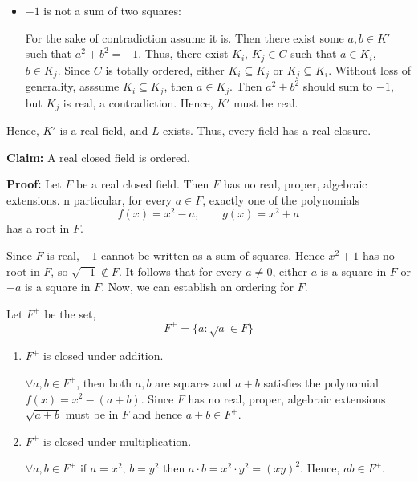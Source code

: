 \documentclass[12pt]{article}
\begin{document}
\begin{solution}
\begin{enumerate}
\begin{enumerate}
\begin{enumerate}
\begin{itemize}
                    \item $-1$ is not a sum of two squares: 

                    For the sake of contradiction assume it is. Then there exist some $a, b \in K'$ such that $a^2 + b^2 = -1$. Thus, there exist $K_i$, $K_j \in C$ such that $a \in K_i$, $b\in K_j$. Since $C$ is totally ordered, either $K_i \subseteq K_j$ or $K_j \subseteq K_i$. Without loss of generality, asssume $K_i \subseteq K_j$, then $a \in K_j$. Then $a^2 + b^2$ should sum to $-1$, but $K_j$ is real, a contradiction. Hence, $K'$ must be real. 
                \end{itemize} 
            \end{enumerate}
            Hence, $K'$ is a real field, and $L$ exists. Thus, every field has a real closure. 

            \textbf{Claim:}
                A real closed field is ordered. 

            \textbf{Proof:}
                Let $F$ be a real closed field. Then $F$ has no real, proper, algebraic extensions. n particular, for every $a\in F$, exactly one of the polynomials
                \[f(x) = x^2-a, \qquad  g(x) = x^2+a\]
                has a root in $F$.


               Since $F$ is real, $-1$ cannot be written as a sum of squares. Hence $x^2+1$ has no root in $F$, so $\sqrt{-1}\notin F$. It follows that for every $a\neq 0$, either $a$ is a square in $F$ or $-a$ is a square in $F$. Now, we can establish an ordering for $F$. 

                Let $F^+$ be the set, 
                \[F^+ = \{ a : \sqrt{a} \in F\}\]

                \begin{enumerate}
                    \item $F^+$ is closed under addition. 
                    
                    $\forall a, b \in F^+$, then both $a, b$ are squares and $a + b$ satisfies the polynomial $f(x) = x^2 - (a+b)$. Since $F$ has no real, proper, algebraic extensions $\sqrt{a+b}$ must be in $F$ and hence $a+b \in F^+$. 
                    
                    \item $F^+$ is closed under multiplication. 
                    
                    $\forall a, b \in F^+$ if $a = x^2, \, b=y^2$ then $a \cdot b = x^2 \cdot y^2 = (xy)^2$. Hence, $ab \in F^+$.


\end{enumerate}
\end{enumerate}
\end{enumerate}
\end{solution}
\end{document}
